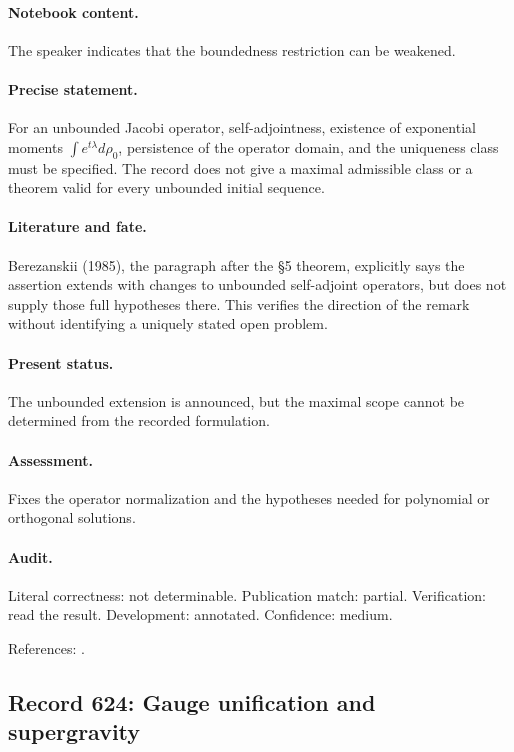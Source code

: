 \paragraph{Notebook content.} The speaker indicates that the boundedness restriction can be weakened.

\paragraph{Precise statement.} For an unbounded Jacobi operator, self-adjointness, existence of exponential moments \(\int e^{t\lambda}d\rho_0\), persistence of the operator domain, and the uniqueness class must be specified. The record does not give a maximal admissible class or a theorem valid for every unbounded initial sequence.

\paragraph{Literature and fate.} Berezanskii (1985), the paragraph after the \S5 theorem, explicitly says the assertion extends with changes to unbounded self-adjoint operators, but does not supply those full hypotheses there. This verifies the direction of the remark without identifying a uniquely stated open problem.

\paragraph{Present status.} The unbounded extension is announced, but the maximal scope cannot be determined from the recorded formulation.

\paragraph{Assessment.} Fixes the operator normalization and the hypotheses needed for polynomial or orthogonal solutions.

\paragraph{Audit.} Literal correctness: not determinable. Publication match: partial. Verification: read the result. Development: annotated. Confidence: medium.

\noindent References: \citep{berezanskii1985integration}.\par

\subsection{Record 624: Gauge unification and supergravity}

